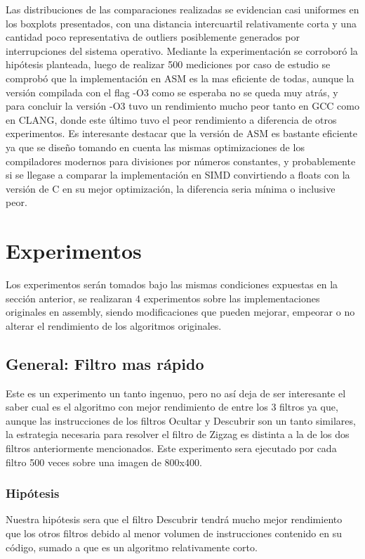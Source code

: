 \documentclass[a4paper]{article}
\begin{document}
Las distribuciones de las comparaciones realizadas se evidencian casi uniformes en los boxplots presentados, con una distancia intercuartil relativamente corta y una cantidad poco representativa de outliers posiblemente generados por interrupciones del sistema operativo. Mediante la experimentación se corroboró la hipótesis planteada, luego de realizar 500 mediciones por caso de estudio se comprobó que la implementación en ASM es la mas eficiente de todas, aunque la versión compilada con el flag -O3 como se esperaba no se queda muy atrás, y para concluir la versión -O3 tuvo un rendimiento mucho peor tanto en GCC como en CLANG, donde este último tuvo el peor rendimiento a diferencia de otros experimentos. Es interesante destacar que la versión de ASM es bastante eficiente ya que se diseño tomando en cuenta las mismas optimizaciones de los compiladores modernos para divisiones por números constantes, y probablemente si se llegase a comparar la implementación en SIMD convirtiendo a floats con la versión de C en su mejor optimización, la diferencia seria mínima o inclusive peor.

\newpage
\section{Experimentos}

Los experimentos serán tomados bajo las mismas condiciones expuestas en la sección anterior, se realizaran 4 experimentos sobre las implementaciones originales en assembly, siendo modificaciones que pueden mejorar, empeorar o no alterar el rendimiento de los algoritmos originales.

\subsection{General: Filtro mas rápido}
Este es un experimento un tanto ingenuo, pero no así deja de ser interesante el saber cual es el algoritmo con mejor rendimiento de entre los 3 filtros ya que, aunque las instrucciones de los filtros Ocultar y Descubrir son un tanto similares, la estrategia necesaria para resolver el filtro de Zigzag es distinta a la de los dos filtros anteriormente mencionados.
Este experimento sera ejecutado por cada filtro 500 veces sobre una imagen de 800x400.
\subsubsection{Hipótesis}
Nuestra hipótesis sera que el filtro Descubrir tendrá mucho mejor rendimiento que los otros filtros debido al menor volumen de instrucciones contenido en su código, sumado a que es un algoritmo relativamente corto.
\end{document}
